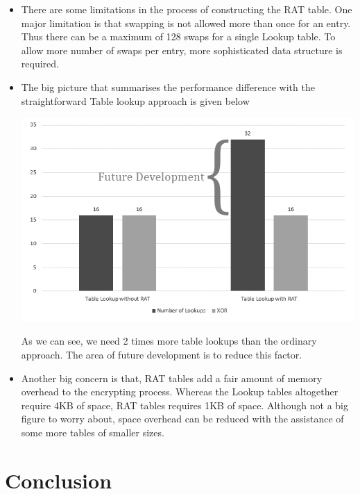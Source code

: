 \documentclass[3p]{elsarticle}
\begin{document}
\begin{itemize}

\item There are some limitations in the process of constructing the RAT table. One major limitation is that swapping is not allowed more than once for an entry. Thus there can be a maximum of 128 swaps for a single Lookup table. To allow more number of swaps per entry, more sophisticated data structure is required.

\item The big picture that summarises the performance difference with the straightforward Table lookup approach is given below

\begin{center}
\includegraphics[scale=0.4,natwidth=713,natheight=436]{Figures/performance.png}
\label{fig: Comparison with straightforward Table Lookup approach.}
\end{center}

As we can see, we need 2 times more table lookups than the ordinary approach. The area of future development is to reduce this factor.

\item Another big concern is that, RAT tables add a fair amount of memory overhead to the encrypting process. Whereas the Lookup tables altogether require 4KB of space, RAT tables requires 1KB of space. Although not a big figure to worry about, space overhead can be reduced with the assistance of some more tables of smaller sizes.

\end{itemize}

\section{Conclusion}
\end{document}
